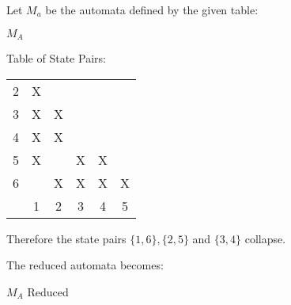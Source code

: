 Let $M_a$ be the automata defined by the given table:
\begin{automata}{$M_A$}
	
	
	
	
	
	
	
	
\end{automata}

Table of State Pairs: \\
\begin{center} \begin{tabular}{*{6}{c|}}
									\cline{1-2}
	2 & X						\\	\cline{1-3}
	3 & X & X					\\	\cline{1-4}
	4 & X & X & 				\\	\cline{1-5}
	5 & X &   & X & X			\\	\cline{1-6}
	6 &   & X & X & X & X		\\	\hline
	  & 1 & 2 & 3 & 4 & 5		\\
\end{tabular} \end{center}

Therefore the state pairs $\{1,6\}, \{2,5\}$ and $\{3,4\}$ collapse.

The reduced automata becomes:
\begin{automata}{$M_A$ Reduced}
	
	
	
	
\end{automata}